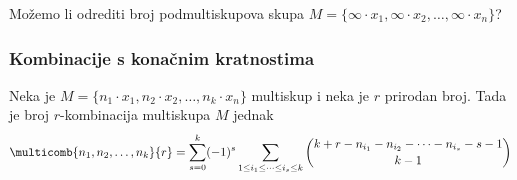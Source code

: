 Možemo li odrediti broj podmultiskupova skupa $M=\{\infty \cdot x_1, \infty \cdot x_2, \dots, \infty \cdot x_n\}$?

\subsubsection{Kombinacije s konačnim kratnostima}

\begin{theorem}
    Neka je $M=\{n_1 \cdot x_1, n_2 \cdot x_2, \dots, n_k \cdot x_n\}$
    multiskup i neka je $r$ prirodan broj. Tada je broj $r$-kombinacija
    multiskupa $M$ jednak
    $$
        \multicomb{n_1,n_2,\dots,n_k}{r} = \sum_{s=0}^{k} (-1)^s \sum_{1 \leq i_1 \leq \dots \leq i_s \leq k} \binom{k+r-n_{i_1}-n_{i_2}-\dots-n_{i_s}-s-1}{k-1}
    $$
\end{theorem}

